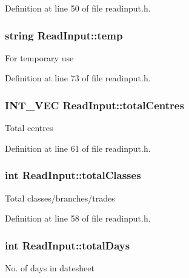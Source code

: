 \-Definition at line 50 of file readinput.\-h.

\hypertarget{classReadInput_ab10b4c63b69664f292d1c66028618008}{
\subsubsection[{temp}]{\setlength{\rightskip}{0pt plus 5cm}string {\bf \-Read\-Input\-::temp}}}\label{classReadInput_ab10b4c63b69664f292d1c66028618008}
\-For temporary use 

\-Definition at line 73 of file readinput.\-h.

\hypertarget{classReadInput_ae6732644e5c3efd46f562493351c9820}{
\subsubsection[{total\-Centres}]{\setlength{\rightskip}{0pt plus 5cm}\-I\-N\-T\-\_\-\-V\-E\-C {\bf \-Read\-Input\-::total\-Centres}}}\label{classReadInput_ae6732644e5c3efd46f562493351c9820}
\-Total centres 

\-Definition at line 61 of file readinput.\-h.

\hypertarget{classReadInput_a32d11288922cc26708b20324ae7b7a77}{
\subsubsection[{total\-Classes}]{\setlength{\rightskip}{0pt plus 5cm}int {\bf \-Read\-Input\-::total\-Classes}}}\label{classReadInput_a32d11288922cc26708b20324ae7b7a77}
\-Total classes/branches/trades 

\-Definition at line 58 of file readinput.\-h.

\hypertarget{classReadInput_a40dc15f03ab1d4c998aa48f2a7176574}{
\subsubsection[{total\-Days}]{\setlength{\rightskip}{0pt plus 5cm}int {\bf \-Read\-Input\-::total\-Days}}}\label{classReadInput_a40dc15f03ab1d4c998aa48f2a7176574}
\-No. of days in datesheet 

